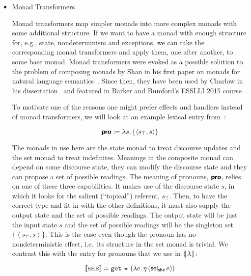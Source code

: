 \begin{itemize}
 
\item Monad
  Transformers~\cite{charlow2014semantics,barker2015monads}

  Monad transformers map simpler monads into more complex monads with some
  additional structure. If we want to have a monad with enough structure
  for, e.g., state, nondeterminism and exceptions, we can take the
  corresponding monad transformers and apply them, one after another, to
  some base monad. Monad transformers were evoked as a possible solution to
  the problem of composing monads by Shan in his first paper on monads for
  natural language semantics~\cite{shan2002monads}. Since then, they have
  been used by Charlow in his dissertation~\cite{charlow2014semantics} and
  featured in Barker and Bumford's ESSLLI 2015
  course~\cite{barker2015monads}.

  To motivate one of the reasons one might prefer effects and handlers
  instead of monad transformers, we will look at an example lexical entry
  from~\cite{charlow2014semantics}:

  $$
  \textsf{\textbf{pro}} \coloneqq \lambda s.\, \{ \left< s_\top, s \right> \}
  $$

  The monads in use here are the state monad to treat discourse updates and
  the set monad to treat indefinites. Meanings in the composite monad can
  depend on some discourse state, they can modify the discourse state and
  they can propose a set of possible readings. The meaning of pronouns,
  $\textsf{\textbf{pro}}$, relies on one of these three capabilities. It
  makes use of the discourse state $s$, in which it looks for the salient
  (``topical'') referent, $s_\top$. Then, to have the correct type and fit
  in with the other definitions, it must also supply the output state and
  the set of possible readings. The output state will be just the input
  state $s$ and the set of possible readings will be the singleton set
  $\{\left< s_\top, s \right>\}$. This is the case even though the pronoun
  has no nondeterministic effect, i.e.\ its structure in the set monad is
  trivial. We contrast this with the entry for pronouns that we use in
  ${\llparenthesis \, \lambda \, \rrparenthesis}$:

  $$
  \llbracket \textsc{she} \rrbracket = \mathtt{get}\,\star\,(\lambda e.\, \eta\,(\mathsf{sel}_{\mathsf{she}}\,e))
  $$


\end{itemize}
